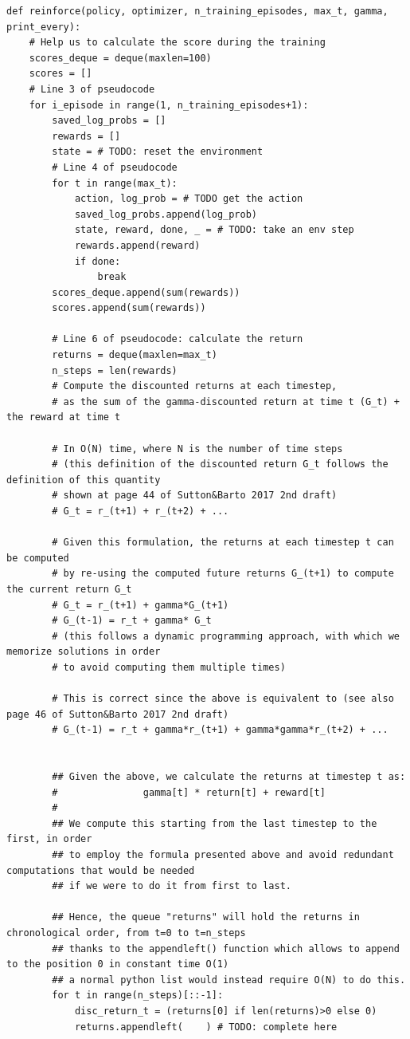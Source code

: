 \documentclass[11pt,a4paper]{article}
\begin{document}
\begin{lstlisting}
def reinforce(policy, optimizer, n_training_episodes, max_t, gamma, print_every):
    # Help us to calculate the score during the training
    scores_deque = deque(maxlen=100)
    scores = []
    # Line 3 of pseudocode
    for i_episode in range(1, n_training_episodes+1):
        saved_log_probs = []
        rewards = []
        state = # TODO: reset the environment
        # Line 4 of pseudocode
        for t in range(max_t):
            action, log_prob = # TODO get the action
            saved_log_probs.append(log_prob)
            state, reward, done, _ = # TODO: take an env step
            rewards.append(reward)
            if done:
                break
        scores_deque.append(sum(rewards))
        scores.append(sum(rewards))

        # Line 6 of pseudocode: calculate the return
        returns = deque(maxlen=max_t)
        n_steps = len(rewards)
        # Compute the discounted returns at each timestep,
        # as the sum of the gamma-discounted return at time t (G_t) + the reward at time t

        # In O(N) time, where N is the number of time steps
        # (this definition of the discounted return G_t follows the definition of this quantity
        # shown at page 44 of Sutton&Barto 2017 2nd draft)
        # G_t = r_(t+1) + r_(t+2) + ...

        # Given this formulation, the returns at each timestep t can be computed
        # by re-using the computed future returns G_(t+1) to compute the current return G_t
        # G_t = r_(t+1) + gamma*G_(t+1)
        # G_(t-1) = r_t + gamma* G_t
        # (this follows a dynamic programming approach, with which we memorize solutions in order
        # to avoid computing them multiple times)

        # This is correct since the above is equivalent to (see also page 46 of Sutton&Barto 2017 2nd draft)
        # G_(t-1) = r_t + gamma*r_(t+1) + gamma*gamma*r_(t+2) + ...


        ## Given the above, we calculate the returns at timestep t as:
        #               gamma[t] * return[t] + reward[t]
        #
        ## We compute this starting from the last timestep to the first, in order
        ## to employ the formula presented above and avoid redundant computations that would be needed
        ## if we were to do it from first to last.

        ## Hence, the queue "returns" will hold the returns in chronological order, from t=0 to t=n_steps
        ## thanks to the appendleft() function which allows to append to the position 0 in constant time O(1)
        ## a normal python list would instead require O(N) to do this.
        for t in range(n_steps)[::-1]:
            disc_return_t = (returns[0] if len(returns)>0 else 0)
            returns.appendleft(    ) # TODO: complete here


\end{lstlisting}
\end{document}
